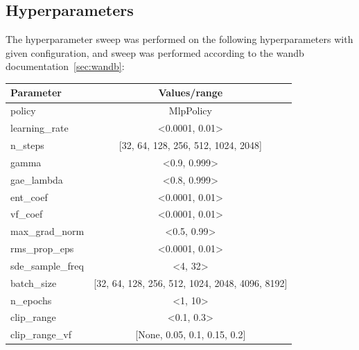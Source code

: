 \documentclass[../xlapes02]{subfiles}
\begin{document}
    \subsection{Hyperparameters}\label{subsec:hyperparameters}
    The hyperparameter sweep was performed on the following hyperparameters with given configuration, and sweep was performed according to the wandb documentation~\cref{sec:wandb}:
    \begin{center}
        \begin{tabular}{|l|c|}
            \hline
            \textbf{Parameter}        & \textbf{Values/range}                           \\ \hline
            policy                    & MlpPolicy                                       \\ \hline
            learning\_rate            & <0.0001, 0.01>                                  \\ \hline
            n\_steps                  & [32, 64, 128, 256, 512, 1024, 2048]             \\ \hline
            gamma                     & <0.9, 0.999>                                    \\ \hline
            gae\_lambda               & <0.8, 0.999>                                    \\ \hline
            ent\_coef                 & <0.0001, 0.01>                                  \\ \hline
            vf\_coef                  & <0.0001, 0.01>                                  \\ \hline
            max\_grad\_norm           & <0.5, 0.99>                                     \\ \hline
            rms\_prop\_eps            & <0.0001, 0.01>                                  \\ \hline
            sde\_sample\_freq         & <4, 32>                                         \\ \hline
            batch\_size               & [32, 64, 128, 256, 512, 1024, 2048, 4096, 8192] \\ \hline
            n\_epochs                 & <1, 10>                                         \\ \hline
            clip\_range               & <0.1, 0.3>                                      \\ \hline
            clip\_range\_vf           & [None, 0.05, 0.1, 0.15, 0.2]                    \\ \hline

\end{tabular}
\end{center}
\end{document}
